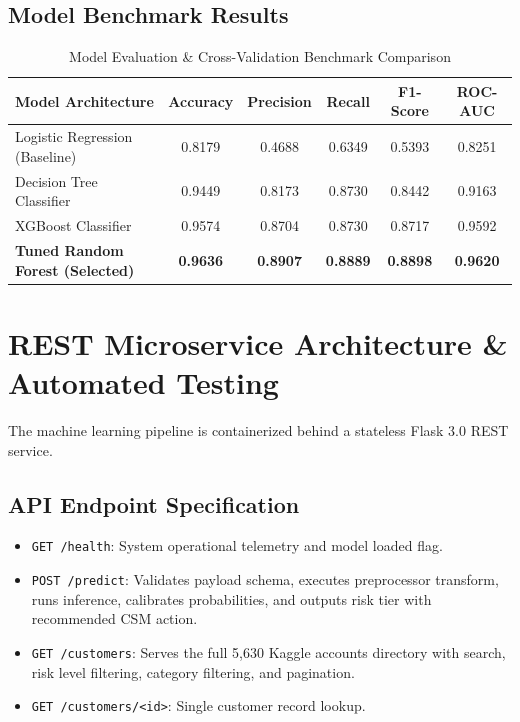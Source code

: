 \documentclass[11pt,a4paper]{article}
\begin{document}
\subsection{Model Benchmark Results}
\begin{table}[H]
    \centering
    \small
    \caption{Model Evaluation \& Cross-Validation Benchmark Comparison}
    \begin{tabular}{lccccc}
        \toprule
        \textbf{Model Architecture} & \textbf{Accuracy} & \textbf{Precision} & \textbf{Recall} & \textbf{F1-Score} & \textbf{ROC-AUC} \\
        \midrule
        Logistic Regression (Baseline) & 0.8179 & 0.4688 & 0.6349 & 0.5393 & 0.8251 \\
        Decision Tree Classifier & 0.9449 & 0.8173 & 0.8730 & 0.8442 & 0.9163 \\
        XGBoost Classifier & 0.9574 & 0.8704 & 0.8730 & 0.8717 & 0.9592 \\
        \textbf{Tuned Random Forest (Selected)} & \textbf{0.9636} & \textbf{0.8907} & \textbf{0.8889} & \textbf{0.8898} & \textbf{0.9620} \\
        \bottomrule
    \end{tabular}
\end{table}

\section{REST Microservice Architecture \& Automated Testing}
The machine learning pipeline is containerized behind a stateless Flask 3.0 REST service.

\subsection{API Endpoint Specification}
\begin{itemize}[noitemsep]
    \item \texttt{GET /health}: System operational telemetry and model loaded flag.
    \item \texttt{POST /predict}: Validates payload schema, executes preprocessor transform, runs inference, calibrates probabilities, and outputs risk tier with recommended CSM action.
    \item \texttt{GET /customers}: Serves the full 5,630 Kaggle accounts directory with search, risk level filtering, category filtering, and pagination.
    \item \texttt{GET /customers/<id>}: Single customer record lookup.
\end{itemize}
\end{document}
